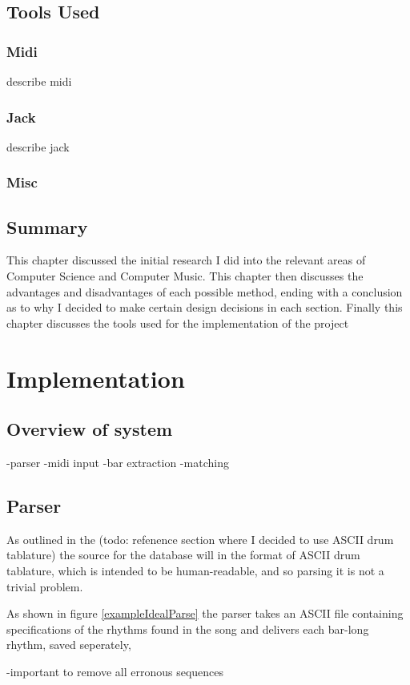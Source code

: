 \documentclass[12pt,twoside,notitlepage]{report}
\begin{document}
	\section{Tools Used}
		\subsection{Midi}
		describe midi
		\subsection{Jack}
		describe jack
		\subsection{Misc}
		
	\section{Summary}
	This chapter discussed the initial research I did into the relevant areas of Computer Science and Computer Music. This chapter then discusses the advantages and disadvantages of each possible method, ending with a conclusion as to why I decided to make certain design decisions in each section. Finally this chapter discusses the tools used for the implementation of the project
\cleardoublepage
\chapter{Implementation}
	\section{Overview of system}
	
	-parser
	-midi input
	-bar extraction
	-matching
	\section{Parser}
	As outlined in the (todo: refenence section where I decided to use ASCII drum tablature) the source for the database will in the format of ASCII drum tablature, which is intended to be human-readable, and so parsing it is not a trivial problem. 
	
	As shown in figure \ref{exampleIdealParse} the parser takes an ASCII file containing specifications of the rhythms found in the song and delivers each bar-long rhythm, saved seperately, 
	
	
	-important to remove all erronous sequences
\end{document}
